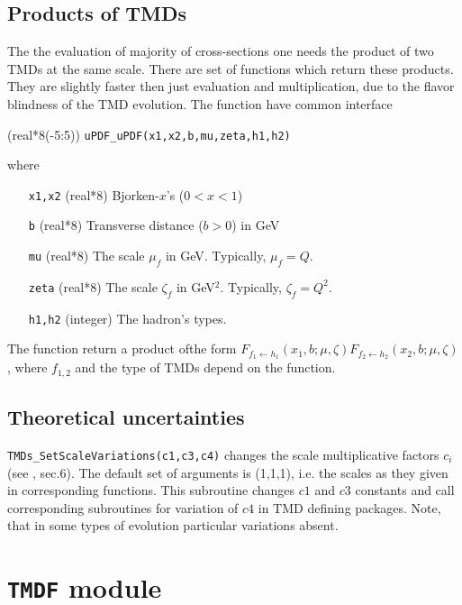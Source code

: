 \documentclass[prd,nofootinbib,eqsecnum,final]{revtex4}
\newcommand{\ot}{\leftarrow}
\renewcommand{\(}{\left(}
\renewcommand{\)}{\right)}
\renewcommand{\[}{\left[}
\renewcommand{\]}{\right]}
\begin{document}
\subsection{Products of TMDs}
\label{TMDs:products}

The the evaluation of majority of cross-sections one needs the product of two TMDs at the same scale. There are set of functions which return these products. They are slightly faster then just evaluation and multiplication, due to the flavor blindness of the TMD evolution. The function have common interface

(real*8(-5:5)) \texttt{uPDF{\_}uPDF(x1,x2,b,mu,zeta,h1,h2)}

where
\begin{itemize}
\item [\texttt{x1,x2}] (real*8) Bjorken-$x$'s ($0<x<1$)
\item [\texttt{b}] (real*8) Transverse distance ($b>0$) in GeV
\item [\texttt{mu}] (real*8) The scale $\mu_f$ in GeV. Typically, $\mu_f=Q$.
\item [\texttt{zeta}] (real*8) The scale $\zeta_f$ in GeV$^2$. Typically, $\zeta_f=Q^2$.
\item [\texttt{h1,h2}] (integer) The hadron's types.
\end{itemize}
The function return a product ofthe form $F_{f_1\ot h_1}(x_1,b;\mu,\zeta)F_{f_2\ot h_2}(x_2,b;\mu,\zeta)$, where $f_{1,2}$ and the type of TMDs depend on the function.



\subsection{Theoretical uncertainties}
\label{TMDs:c123}

\texttt{TMDs\_SetScaleVariations(c1,c3,c4)} changes the scale multiplicative factors $c_i$ (see \cite{Scimemi:2018xaf}, sec.6). The default set of arguments is (1,1,1), i.e. the scales as they given in corresponding functions. This subroutine changes $c1$ and $c3$ constants and call corresponding subroutines for variation of $c4$ in TMD defining packages. Note, that in some types of evolution particular variations absent.

\newpage

\section{\texttt{TMDF} module}
\label{TMDF}
\end{document}
